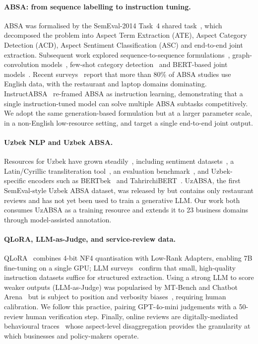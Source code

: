 \documentclass[runningheads]{llncs}
\begin{document}
\paragraph{ABSA: from sequence labelling to instruction tuning.}
ABSA was formalised by the SemEval-2014 Task~4 shared
task~\cite{pontiki-etal-2014-semeval}, which decomposed the problem into
Aspect Term Extraction (ATE), Aspect Category Detection (ACD), Aspect
Sentiment Classification (ASC) and end-to-end joint extraction. Subsequent
work explored sequence-to-sequence
formulations~\cite{ma-etal-2019-exploring},
graph-convolution models~\cite{10.1145/3721844}, few-shot category
detection~\cite{hu-etal-2021-multi-label} and BERT-based joint
models~\cite{electronics12030515}. Recent surveys~\cite{Hua2024,ZohrehMadhoushi2019} report that more than 80\% of ABSA studies use
English data, with the restaurant and laptop domains dominating.
InstructABSA~\cite{scaria-etal-2024-instructabsa} re-framed ABSA as
instruction learning, demonstrating that a single instruction-tuned model
can solve multiple ABSA subtasks competitively. We adopt the same
generation-based formulation but at a larger parameter scale, in a
non-English low-resource setting, and target a single end-to-end joint
output.

\paragraph{Uzbek NLP and Uzbek ABSA.} Resources for Uzbek have grown
steadily~\cite{kuriyozov2019building,matlatipov2022uzbek,uzbekendingssanat,sharipov2023uzbektagger,annoation}, including sentiment
datasets~\cite{kuriyozov2022construction}, a Latin/Cyrillic
transliteration tool~\cite{kuriyozov2022a}, an evaluation
benchmark~\cite{Salaev2024}, and Uzbek-specific encoders such as
BERTbek~\cite{kuriyozov-etal-2024-bertbek} and
TahrirchiBERT~\cite{Mamasaidov2023TahrirchiBERT}. UzABSA, the first
SemEval-style Uzbek ABSA dataset, was released by
\cite{matlatipov2024uzabsa} but contains only restaurant reviews and has not
yet been used to train a generative LLM. Our work both consumes UzABSA as a
training resource and extends it to 23 business domains through model-assisted
annotation.

\paragraph{QLoRA, LLM-as-Judge, and service-review data.}
QLoRA~\cite{10.5555/3666122.3666563} combines 4-bit NF4 quantisation with
Low-Rank Adapters, enabling 7B fine-tuning on a single GPU; LLM
surveys~\cite{10.1145/3777411} confirm that small, high-quality instruction
datasets suffice for structured extraction. Using a strong LLM to score weaker
outputs (LLM-as-Judge) was popularised by MT-Bench and Chatbot
Arena~\cite{10.5555/3666122.3668142} but is subject to position and verbosity
biases~\cite{2506.22316}, requiring human calibration. We follow this practice,
pairing GPT-4o-mini judgements with a 50-review human verification step.
Finally, online reviews are digitally-mediated behavioural
traces~\cite{Hua2024} whose aspect-level disaggregation provides the
granularity at which businesses and policy-makers operate.
\end{document}
